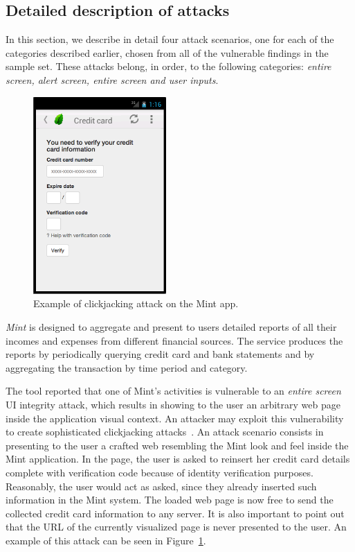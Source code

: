 \subsection{Detailed description of attacks}
\label{sec:remarkableResults}

In this section, we describe in detail four attack scenarios, one for each of the categories described earlier, chosen from all of the vulnerable findings in the sample set. These attacks belong, in order, to the following categories: \emph{entire screen, alert screen,
entire screen and user inputs}.

\begin{figure}[tb]
  \centering
    \includegraphics[width=2in]{./images/mint-example.png}
  \caption{Example of clickjacking attack on the Mint app.}
  \label{fig:mint}
\end{figure}

\textit{Mint} is designed to aggregate and present to users detailed reports of all their incomes and expenses from different financial sources.
The service produces the reports by periodically querying credit card and bank statements and by aggregating the transaction by time period and category.

The tool reported that one of Mint's activities is vulnerable to an \emph{entire screen} UI integrity attack, which results in showing to the user an arbitrary web page inside the application visual context. An attacker may exploit this vulnerability to create sophisticated clickjacking attacks~\cite{android-clickjacking}. An attack scenario consists in presenting to the user a crafted web resembling the Mint look and feel inside the Mint application.
In the page, the user is asked to reinsert her credit card details complete
with verification code because of identity verification purposes. Reasonably, the user would act as asked, since they already inserted such information in the Mint system.
The loaded web page is now free to send the collected credit card information to any server. It is also important to point out that the URL of the currently visualized page is never presented to the user. An example of this attack can be seen in Figure~\ref{fig:mint}.


